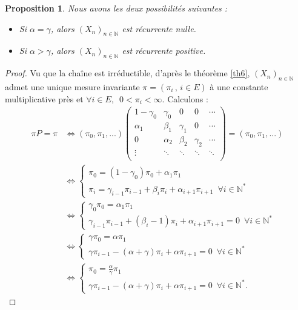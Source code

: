 \documentclass[12pt,a4paper]{report}
\newtheorem{prop}[thm]{Proposition}
\theoremstyle{remark}
\begin{document}
\begin{prop}\label{nulle_positive}
Nous avons les deux possibilités suivantes :
\begin{itemize}
    \item  Si $\alpha = \gamma$, alors $(X_n)_{n \in \mathbb{N}}$ est récurrente nulle.
    \item Si $\alpha > \gamma$, alors $(X_n)_{n \in \mathbb{N}}$ est récurrente positive.
\end{itemize}
\end{prop}
\begin{proof}
Vu que la chaîne est irréductible, d'après le théorème \ref{th6}, $(X_n)_{n\in\mathbb{N}}$ admet une unique mesure invariante $\pi=(\pi_i\, , \, i \in E)$ à une constante multiplicative près et $\forall i \in E, \, \, \, 0< \pi_i<\infty$. Calculons :
\begin{align*}
\pi P=\pi
&\iff (\pi_0,\pi_1,...) \begin{pmatrix}
        1-\gamma_0 & \gamma_0 & 0 & 0 & \cdots \\
         \alpha_1 & \beta_1 & \gamma_1 & 0 & \cdots\\
         0 & \alpha_2 & \beta_2 & \gamma_2 & \cdots\\
        \vdots &\ddots & \ddots & \ddots & \ddots \\
\end{pmatrix} = (\pi_0,\pi_1,...)\\
&\iff
\left\{
\begin{array}{ll}
        \pi_0=(1-\gamma_0)\pi_0+\alpha_1\pi_1 \\
        \pi_i=\gamma_{i-1}\pi_{i-1}+\beta_{i}\pi_{i}+\alpha_{i+1}\pi_{i+1} \, \, \, \forall i \in \mathbb{N}^*
    \end{array}
\right. \\
&\iff \left\{
\begin{array}{ll}
         \gamma_0\pi_0=\alpha_1\pi_1 \\
        \gamma_{i-1}\pi_{i-1}+(\beta_{i}-1)\pi_{i}+\alpha_{i+1}\pi_{i+1} = 0 \, \, \, \forall i \in \mathbb{N}^*
    \end{array}
\right. \\
&\iff \left\{
\begin{array}{ll}
         \gamma\pi_0=\alpha\pi_1 \\
        \gamma\pi_{i-1}-(\alpha+\gamma)\pi_{i}+\alpha\pi_{i+1} = 0 \, \, \, \forall i \in \mathbb{N}^*
    \end{array}
\right. \\
&\iff \left\{
\begin{array}{ll}
         \pi_0=\frac{\alpha}{\gamma}\pi_1 \\
        \gamma\pi_{i-1}-(\alpha+\gamma)\pi_{i}+\alpha\pi_{i+1} = 0 \, \, \, \forall i \in \mathbb{N}^*.
    \end{array}
\right.
\end{align*}


\end{proof}
\end{document}

